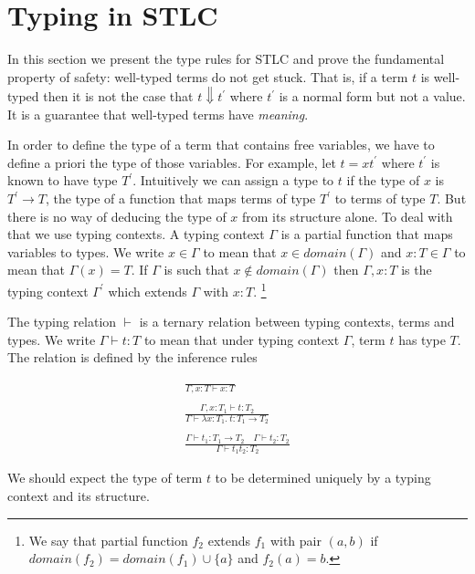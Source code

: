 
\section{Typing in STLC}

In this section we present the type rules for STLC and prove the fundamental property of safety: well-typed terms do not get stuck. That is, if a term $t$ is well-typed then it is not the case that $t \Downarrow t^{'}$ where $t^{'}$ is a normal form but not a value. It is a guarantee that well-typed terms have \emph{meaning}.  

In order to define the type of a term that contains free variables, we have to define a priori the type of those variables. For example, let $t = xt^{'}$ where $t^{'}$ is known to have type $T^{'}$. Intuitively we can assign a type to $t$ if the type of $x$ is $T^{'} \to T$,  the type of a function that maps terms of type $T^{'}$ to terms of type $T$. But there is no way of deducing the type of $x$ from its structure alone.  To deal with that we use typing contexts. A typing context $\Gamma$ is a partial function that maps variables to types. We write $x \in \Gamma$ to mean that $x \in domain(\Gamma)$ and $x:T \in \Gamma$ to mean that $\Gamma(x) = T$. If $\Gamma$ is such that $x \not \in domain(\Gamma)$ then $\Gamma, x:T$ is the typing context $\Gamma^{'}$ which extends $\Gamma$ with $x:T$. \footnote{We say that partial function $f_2$ extends $f_1$ with pair $(a,b)$ if $domain(f_2) = domain(f_1) \cup \{a\}$ and $f_2(a) = b$.}

The typing relation $\vdash$ is a ternary relation between typing contexts, terms and types. We write $\Gamma \vdash t:T$ to mean that under typing context $\Gamma$, term $t$ has type $T$. The relation is defined by the inference rules
 
\begin{align*}
\frac
{}
{\Gamma, x:T \vdash x:T} \label{rule:type-var} \tag{$\lambda$-TypeVar}\\
\\
\frac
{\Gamma, x:T_1 \vdash t:T_2}
{\Gamma \vdash \lambda x : T_1 . \ t: T_1 \to T_2} \label{rule:type-abs} \tag{$\lambda$-TypeAbs}\\
\\
\frac 
{\Gamma \vdash t_1 : T_1 \to T_2 \quad \Gamma \vdash t_2 : T_2}
{\Gamma \vdash t_1t_2: T_2} \label{rule:type-app} \tag{$\lambda$-TypeApp}
\end{align*}

We should expect the type of term $t$ to be determined uniquely by a typing context and its structure. 

